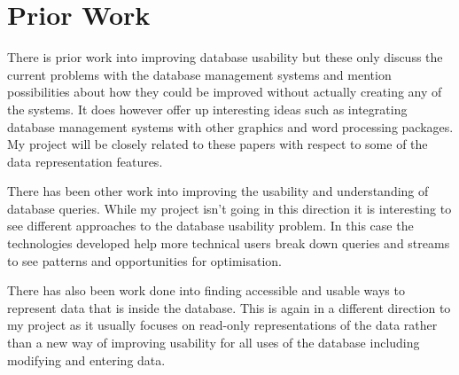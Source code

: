 \chapter{Prior Work}

There is prior work into improving database usability\cite{Date, Jagadish2007} but these only discuss the current problems with the database management systems and mention possibilities about how they could be improved without actually creating any of the systems. It does however offer up interesting ideas such as integrating database management systems with other graphics and word processing packages. My project will be closely related to these papers with respect to some of the data representation features. 

There has been other work into improving the usability and understanding of database queries\cite{Hu2008,Haritsa2010,Yang2010,Jin2010}. While my project isn't going in this direction it is interesting to see different approaches to the database usability problem. In this case the technologies developed help more technical users break down queries and streams to see patterns and opportunities for optimisation.

There has also been work done into finding accessible and usable ways to represent data that is inside the database\cite{Stolte2010,Chan2009}. This is again in a different direction to my project as it usually focuses on read-only representations of the data rather than a new way of improving usability for all uses of the database including modifying and entering data.